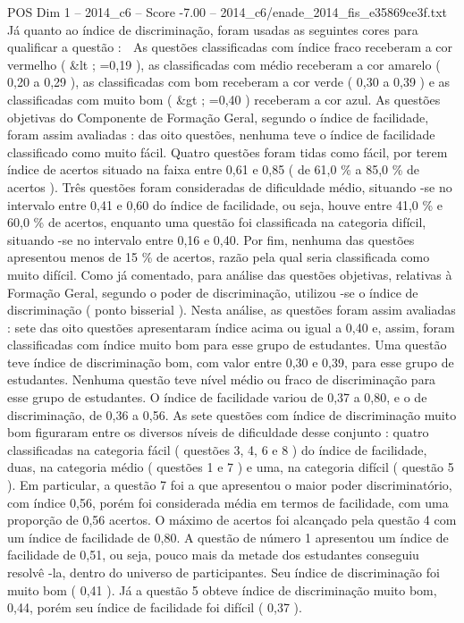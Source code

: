 \begin{textsample}{POS Dim 1 – 2014\_c6 – Score -7.00 – 2014\_c6/enade\_2014\_fis\_e35869ce3f.txt}
Já quanto ao índice de discriminação, foram usadas as seguintes cores para qualificar a questão :  As questões classificadas com índice fraco receberam a cor vermelho ( \&lt ; =0,19 ), as classificadas com médio receberam a cor amarelo ( 0,20 a 0,29 ), as classificadas com bom receberam a cor verde ( 0,30 a 0,39 ) e as classificadas com muito bom ( \&gt ; =0,40 ) receberam a cor azul.
As questões objetivas do Componente de Formação Geral, segundo o índice de facilidade, foram assim avaliadas : das oito questões, nenhuma teve o índice de facilidade classificado como muito fácil.
Quatro questões foram tidas como fácil, por terem índice de acertos situado na faixa entre 0,61 e 0,85 ( de 61,0 \% a 85,0 \% de acertos ).
Três questões foram consideradas de dificuldade médio, situando -se no intervalo entre 0,41 e 0,60 do índice de facilidade, ou seja, houve entre 41,0 \% e 60,0 \% de acertos, enquanto uma questão foi classificada na categoria difícil, situando -se no intervalo entre 0,16 e 0,40.
Por fim, nenhuma das questões apresentou menos de 15 \% de acertos, razão pela qual seria classificada como muito difícil.
Como já comentado, para análise das questões objetivas, relativas à Formação Geral, segundo o poder de discriminação, utilizou -se o índice de discriminação ( ponto bisserial ).
Nesta análise, as questões foram assim avaliadas : sete das oito questões apresentaram índice acima ou igual a 0,40 e, assim, foram classificadas com índice muito bom para esse grupo de estudantes.
Uma questão teve índice de discriminação bom, com valor entre 0,30 e 0,39, para esse grupo de estudantes.
Nenhuma questão teve nível médio ou fraco de discriminação para esse grupo de estudantes.
O índice de facilidade variou de 0,37 a 0,80, e o de discriminação, de 0,36 a 0,56.
As sete questões com índice de discriminação muito bom figuraram entre os diversos níveis de dificuldade desse conjunto : quatro classificadas na categoria fácil ( questões 3, 4, 6 e 8 ) do índice de facilidade, duas, na categoria médio ( questões 1 e 7 ) e uma, na categoria difícil ( questão 5 ).
Em particular, a questão 7 foi a que apresentou o maior poder discriminatório, com índice 0,56, porém foi considerada média em termos de facilidade, com uma proporção de 0,56 acertos.
O máximo de acertos foi alcançado pela questão 4 com um índice de facilidade de 0,80.
A questão de número 1 apresentou um índice de facilidade de 0,51, ou seja, pouco mais da metade dos estudantes conseguiu resolvê -la, dentro do universo de participantes.
Seu índice de discriminação foi muito bom ( 0,41 ).
Já a questão 5 obteve índice de discriminação muito bom, 0,44, porém seu índice de facilidade foi difícil ( 0,37 ).

\end{textsample}
